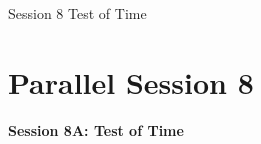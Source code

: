 \clearpage
{}
\begin{ThreeSessionOverview}{Session 8}{\daydateyear}
  {Test of Time}
\end{ThreeSessionOverview}

\newpage
\section*{Parallel Session 8}
{\bfseries\large Session 8A: Test of Time}\\
\TrackALoc\hfill{}
\clearpage


